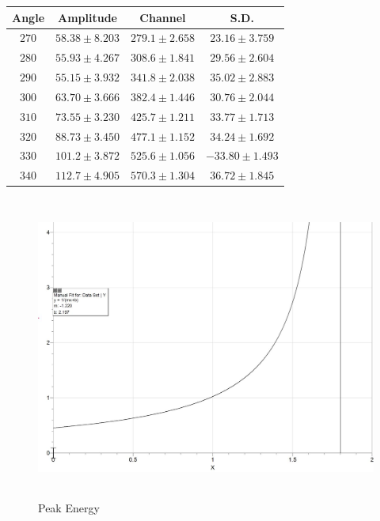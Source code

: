 \documentclass[fleqn]{article}
\begin{document}
  \begin{center}
    \begin{tabular}{||c c c c||} 
     \hline
     Angle & Amplitude & Channel & S.D. \\ [0.5ex] 
     \hline\hline
     $270$ & $58.38 \pm 8.203$ & $279.1 \pm 2.658$ & $23.16 \pm 3.759$ \\ 
     \hline
     $280$ & $55.93 \pm 4.267$ & $308.6 \pm 1.841$ & $29.56 \pm 2.604$ \\
     \hline
     $290$ & $55.15 \pm 3.932$ & $341.8 \pm 2.038$ & $35.02 \pm 2.883$ \\
     \hline
     $300$ & $63.70 \pm 3.666$ & $382.4 \pm 1.446$ & $30.76 \pm 2.044$ \\
     \hline
     $310$ & $73.55 \pm 3.230$ & $425.7 \pm 1.211$ & $33.77 \pm 1.713$ \\
     \hline
     $320$ & $88.73 \pm 3.450$ & $477.1 \pm 1.152$ & $34.24 \pm 1.692$ \\
     \hline
     $330$ & $101.2 \pm 3.872$ & $525.6 \pm 1.056$ & $-33.80 \pm 1.493$ \\
     \hline
     $340$ & $112.7 \pm 4.905$ & $570.3 \pm 1.304$ & $36.72 \pm 1.845$ \\ [1ex] 
     \hline
    \end{tabular}
  \end{center}
  
  \begin{figure}[htbp]
    \includegraphics[height=10cm, width=18cm]{Twelve.JPG}
    \caption{
      Peak Energy
    }
  \end{figure}
\end{document}
